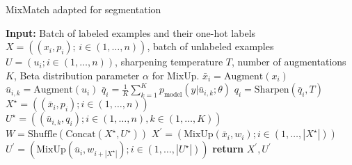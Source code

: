 \begin{algorithm}[H]
    \caption{MixMatch adapted for segmentation}
    \label{alg:mixmatch-seg}
    \begin{algorithmic}[2]
      \State \textbf{Input:} Batch of labeled examples and their one-hot labels $X = ((x_i, p_i);\,i \in (1, \dots, n))$, batch of unlabeled examples $U = (u_i; i \in (1, \dots, n))$, sharpening temperature $T$, number of augmentations $K$, Beta distribution parameter $\alpha$ for MixUp.
       \State $\bar{x}_i = \text{Augment}(x_i)$ 
        \State $\bar{u}_{i,k} = \text{Augment}(u_i)$ 
       \EndFor
       \State $\bar{q}_i = \frac{1}{K} \sum_{k=1}^{K} p_{\text{model}}(y|\bar{u}_{i,k}; \theta)$ 
       \State $q_i = \text{Sharpen}(\bar{q}_i, T)$ 
      \EndFor
      \State $X^\star = ((\bar{x}_i, p_i); i \in (1, \dots, n))$ 
      \State $U^\star = ((\bar{u}_{i,k}, q_i); i \in (1, \dots, n), k \in (1, \dots, K))$ 
      \State $W = \text{Shuffle}(\text{Concat}(X^\star, U^\star))$ 
      \State $X^\prime = (\text{MixUp}(\bar{x}_i, w_i); i \in (1, \dots, |X^\star|))$ 
      \State $U^\prime = (\text{MixUp}(\bar{u}_{i}, w_{i+|X^\star|}); i \in (1, \dots, |U^\star|))$ 
      \State \textbf{return} $X^\prime, U^\prime$
      
    \end{algorithmic}
   \end{algorithm}